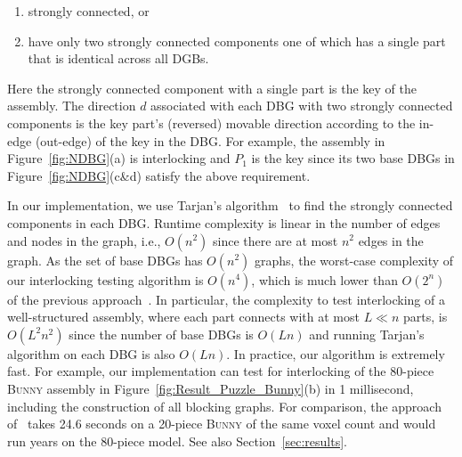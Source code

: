 \begin{enumerate}
\item strongly connected, or 
\item have only two strongly connected components one of which has a single part that is identical across all DGBs.
\end{enumerate}	
Here the strongly connected component with a single part is the key of the assembly.
The direction $d$ associated with each DBG with two strongly connected components is the key part's (reversed) movable direction according to the in-edge (out-edge) of the key in the DBG.
For example, the assembly in Figure~\ref{fig:NDBG}(a) is interlocking and $P_1$ is the key since its two base DBGs in Figure~\ref{fig:NDBG}(c\&d) satisfy the above requirement.

In our implementation, we use Tarjan's algorithm~\cite{Tarjan-1972-SCC} to find the strongly connected components in each DBG. Runtime complexity is linear in the number of edges and nodes in the graph, i.e., $O(n^2)$ since there are at most $n^2$ edges in the graph.
As the set of base DBGs has $O(n^2)$ graphs, the worst-case complexity of our interlocking testing algorithm is $O(n^4)$, which is much lower than $O(2^n)$ of the previous approach~\cite{Song-2012-InterCubes}.
In particular, the complexity to test interlocking of a well-structured assembly, 
where each part connects with at most $L\ll n$ parts, is $O(L^2n^2)$ since the number of base DBGs is $O(Ln)$ and running Tarjan's algorithm on each DBG is also $O(Ln)$.
In practice, our algorithm is extremely fast. For example, our implementation can test for interlocking of the 80-piece \textsc{Bunny} assembly in Figure~\ref{fig:Result_Puzzle_Bunny}(b) in 1 millisecond, including the construction of all blocking graphs. For comparison, the approach of~\cite{Song-2012-InterCubes} takes 24.6 seconds on a 20-piece \textsc{Bunny} of the same voxel count and would run years on the 80-piece model.
See also Section~\ref{sec:results}.

 



